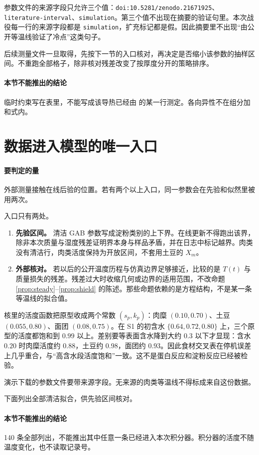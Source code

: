 参数文件的来源字段只允许三个值：\texttt{doi:10.5281/zenodo.21671925}、\texttt{literature-interval}、\texttt{simulation}。第三个值不出现在摘要的验证句里。本次战役每一行的来源字段都是 \texttt{simulation}，扩充标记都是假。因此摘要里不出现“由公开等温线验证了冷点”这类句子。

后续测量文件一旦取得，先按下一节的入口核对，再决定是否缩小该参数的抽样区间。不重跑全部格子，除非核对残差改变了按厚度分开的策略排序。

\paragraph{本节不能推出的结论}
临时约束写在表里，不能写成该导热已经由 \cite{choi1986} 的某一行测定。各向异性不在组分加和式内。

\section{数据进入模型的唯一入口}

\paragraph{要判定的量}
外部测量接触在线后验的位置。若有两个以上入口，同一参数会在先验和似然里被用两次。

入口只有两处。

\begin{enumerate}
\item \textbf{先验区间。} 清洁 GAB 参数写成淀粉类别的上下界。在线更新不得跑出该界，除非本次质量与湿度残差证明界本身与样品矛盾，并在日志中标记越界。肉类没有清洁行，肉类活度保持为开放区间，不套用土豆的 \(X_m\)。
\item \textbf{外部核对。} 若以后的公开温度历程与仿真边界足够接近，比较的是 \(T(t)\) 与质量损失的残差。残差过大时收缩几何或边界的适用范围，不改命题 \ref{prop:steady}--\ref{prop:shield} 的陈述。那些命题依赖的是方程结构，不是某一条等温线的拟合值。
\end{enumerate}

核里的活度函数把原型收成两个常数 \((s_p,k_p)\)：肉糜 \((0.10,0.70)\)、土豆 \((0.055,0.80)\)、面团 \((0.08,0.75)\)。在 S1 的初含水 \(\{0.64,0.72,0.80\}\) 上，三个原型的活度都饱和到 \(0.99\) 以上。差别要等表面含水降到大约 \(0.3\) 以下才显现：含水 \(0.20\) 时肉糜活度约 \(0.88\)，土豆约 \(0.98\)，面团约 \(0.93\)。因此食材交叉表在停机误差上几乎重合，与“高含水段活度饱和”一致。这不是蛋白反应和淀粉反应已经被检验。

演示下载的参数文件要带来源字段。无来源的肉类等温线不得标成来自这份数据。

下面列出全部清洁拟合，供先验区间核对。



\paragraph{本节不能推出的结论}
140 条全部列出，不能推出其中任意一条已经进入本次积分器。积分器的活度不随温度变化，也不读取记录号。
